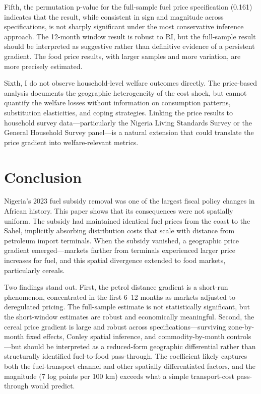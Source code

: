 \documentclass[12pt]{article}
\begin{document}
Fifth, the permutation p-value for the full-sample fuel price specification (0.161) indicates that the result, while consistent in sign and magnitude across specifications, is not sharply significant under the most conservative inference approach. The 12-month window result is robust to RI, but the full-sample result should be interpreted as suggestive rather than definitive evidence of a persistent gradient. The food price results, with larger samples and more variation, are more precisely estimated.

Sixth, I do not observe household-level welfare outcomes directly. The price-based analysis documents the geographic heterogeneity of the cost shock, but cannot quantify the welfare losses without information on consumption patterns, substitution elasticities, and coping strategies. Linking the price results to household survey data---particularly the Nigeria Living Standards Survey or the General Household Survey panel---is a natural extension that could translate the price gradient into welfare-relevant metrics.


\section{Conclusion}
\label{sec:conclusion}

Nigeria's 2023 fuel subsidy removal was one of the largest fiscal policy changes in African history. This paper shows that its consequences were not spatially uniform. The subsidy had maintained identical fuel prices from the coast to the Sahel, implicitly absorbing distribution costs that scale with distance from petroleum import terminals. When the subsidy vanished, a geographic price gradient emerged---markets farther from terminals experienced larger price increases for fuel, and this spatial divergence extended to food markets, particularly cereals.

Two findings stand out. First, the petrol distance gradient is a short-run phenomenon, concentrated in the first 6--12 months as markets adjusted to deregulated pricing. The full-sample estimate is not statistically significant, but the short-window estimates are robust and economically meaningful. Second, the cereal price gradient is large and robust across specifications---surviving zone-by-month fixed effects, Conley spatial inference, and commodity-by-month controls---but should be interpreted as a reduced-form geographic differential rather than structurally identified fuel-to-food pass-through. The coefficient likely captures both the fuel-transport channel and other spatially differentiated factors, and the magnitude (7 log points per 100 km) exceeds what a simple transport-cost pass-through would predict.
\end{document}
